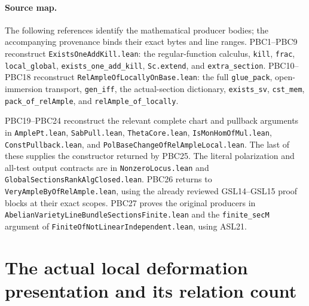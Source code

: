 \documentclass[11pt,a4paper]{article}
\numberwithin{equation}{section}
\theoremstyle{remark}\newtheorem{remark}[theorem]{Remark}
\begin{document}
\paragraph{Source map.}
The following references identify the mathematical producer bodies;
the accompanying provenance binds their exact bytes and line ranges.
PBC1--PBC9 reconstruct
\texttt{Exists\allowbreak One\allowbreak Add\allowbreak Kill.\allowbreak lean}: the regular-function calculus,
\texttt{kill}, \texttt{frac}, \texttt{local\_\allowbreak global},
\texttt{exists\_\allowbreak one\_\allowbreak add\_\allowbreak kill}, \texttt{Sc.\allowbreak extend}, and
\texttt{extra\_\allowbreak section}.
PBC10--PBC18 reconstruct
\texttt{Rel\allowbreak Ample\allowbreak Of\allowbreak Locally\allowbreak On\allowbreak Base.\allowbreak lean}: the full
\texttt{glue\_\allowbreak pack}, open-immersion transport,
\texttt{gen\_\allowbreak iff}, the actual-section dictionary,
\texttt{exists\_\allowbreak sv}, \texttt{cst\_\allowbreak mem},
\texttt{pack\_\allowbreak of\_\allowbreak rel\allowbreak Ample}, and
\texttt{rel\allowbreak Ample\_\allowbreak of\_\allowbreak locally}.

PBC19--PBC24 reconstruct the relevant complete chart and pullback
arguments in \texttt{Ample\allowbreak Pt.\allowbreak lean}, \texttt{Sab\allowbreak Pull.\allowbreak lean},
\texttt{Theta\allowbreak Core.\allowbreak lean}, \texttt{Is\allowbreak Mon\allowbreak Hom\allowbreak Of\allowbreak Mul.\allowbreak lean},
\texttt{Const\allowbreak Pullback.\allowbreak lean}, and
\texttt{Pol\allowbreak Base\allowbreak Change\allowbreak Of\allowbreak Rel\allowbreak Ample\allowbreak Local.\allowbreak lean}.
The last of these supplies the constructor returned by PBC25.
The literal polarization and all-test output contracts are in
\texttt{Nonzero\allowbreak Locus.\allowbreak lean} and
\texttt{Global\allowbreak Sections\allowbreak Rank\allowbreak Alg\allowbreak Closed.\allowbreak lean}.
PBC26 returns to
\texttt{Very\allowbreak Ample\allowbreak By\allowbreak Of\allowbreak Rel\allowbreak Ample.\allowbreak lean}, using the already reviewed
GSL14--GSL15 proof blocks at their exact scopes.
PBC27 proves the original producers in
\texttt{Abelian\allowbreak Variety\allowbreak Line\allowbreak Bundle\allowbreak Sections\allowbreak Finite.\allowbreak lean} and
the \texttt{finite\_\allowbreak sec\allowbreak M} argument of
\texttt{Finite\allowbreak Of\allowbreak Not\allowbreak Linear\allowbreak Independent.\allowbreak lean}, using ASL21.


\section{The actual local deformation presentation and its relation count}
\label{sec:arithmetic-presentations}
\end{document}
